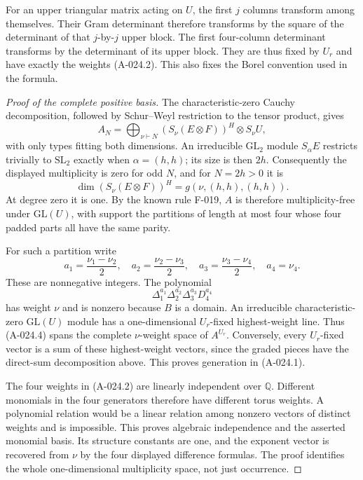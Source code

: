For an upper triangular matrix acting on $U$, the first $j$
columns transform among themselves. Their Gram determinant
therefore transforms by the square of the determinant of that
$j$-by-$j$ upper block. The first four-column determinant
transforms by the determinant of its upper block. They are
thus fixed by $U_r$ and have exactly the weights (A-024.2).
This also fixes the Borel convention used in the formula.

\begin{proof}[Proof of the complete positive basis]
The characteristic-zero Cauchy decomposition, followed by
Schur--Weyl restriction to the tensor product, gives
\[
 A_N=\bigoplus_{\nu\vdash N}
       (S_\nu(E\otimes F))^H\otimes S_\nu U,
\]
with only types fitting both dimensions. An irreducible
$\mathrm{GL}_2$ module $S_\alpha E$ restricts trivially to
$\mathrm{SL}_2$ exactly when $\alpha=(h,h)$; its size is
then $2h$. Consequently the displayed multiplicity is zero
for odd $N$, and for $N=2h>0$ it is
\[
       \dim(S_\nu(E\otimes F))^H
                         =g(\nu,(h,h),(h,h)).           \tag{A-024.3}
\]
At degree zero it is one. By the known rule F-019, $A$ is
therefore multiplicity-free under $\mathrm{GL}(U)$, with
support the partitions of length at most four whose four
padded parts all have the same parity.

For such a partition write
\[
 a_1=\frac{\nu_1-\nu_2}{2},\quad
 a_2=\frac{\nu_2-\nu_3}{2},\quad
 a_3=\frac{\nu_3-\nu_4}{2},\quad a_4=\nu_4.
\]
These are nonnegative integers. The polynomial
\[
                    \Delta_1^{a_1}\Delta_2^{a_2}
                                  \Delta_3^{a_3}D_4^{a_4}             \tag{A-024.4}
\]
has weight $\nu$ and is nonzero because $B$ is a domain.
An irreducible characteristic-zero $\mathrm{GL}(U)$ module
has a one-dimensional $U_r$-fixed highest-weight line.
Thus (A-024.4) spans the complete $\nu$-weight space of
$A^{U_r}$. Conversely, every $U_r$-fixed vector is a sum
of these highest-weight vectors, since the graded pieces
have the direct-sum decomposition above. This proves
generation in (A-024.1).

The four weights in (A-024.2) are linearly independent over
$\mathbb Q$. Different monomials in the four generators
therefore have different torus weights. A polynomial relation
would be a linear relation among nonzero vectors of distinct
weights and is impossible. This proves algebraic independence
and the asserted monomial basis. Its structure constants are
one, and the exponent vector is recovered from $\nu$ by the
four displayed difference formulas. The proof identifies the
whole one-dimensional multiplicity space, not just occurrence.
\end{proof}

